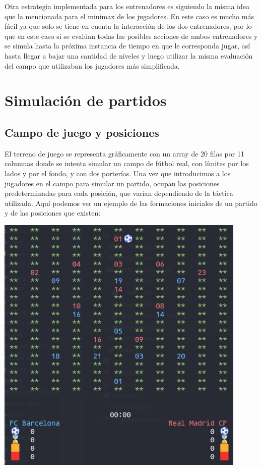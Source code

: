 \documentclass{article}
\begin{document}
Otra estrategia implementada para los entrenadores es siguiendo la misma idea que la mencionada para el minimax de los jugadores.
En este caso es mucho más fácil ya que solo se tiene en cuenta la interacción de los dos entrenadores, por lo que en este
caso si se evalúan todas las posibles acciones de ambos entrenadores y se simula hasta la próxima instancia de tiempo en que le corresponda
jugar, así hasta llegar a bajar una cantidad de niveles y luego utilizar la misma evaluación del campo que utilizaban los jugadores
más simplificada.   

\section{Simulación de partidos}
\subsection{Campo de juego y posiciones}
El terreno de juego se representa gráficamente con un
array de 20 filas por 11 columnas donde se intenta simular un campo de fútbol real, con límites por los lados y por 
el fondo, y con dos porterías. Una vez que introducimos a los jugadores en el campo para simular un partido, ocupan 
las posiciones predeterminadas para cada posición, que varían dependiendo de la táctica utilizada. Aquí podemos ver 
un ejemplo de las formaciones iniciales de un partido y de las posiciones que existen: 

\includegraphics*[width=0.9\textwidth]{filed.jpg}
\bigskip
\end{document}
